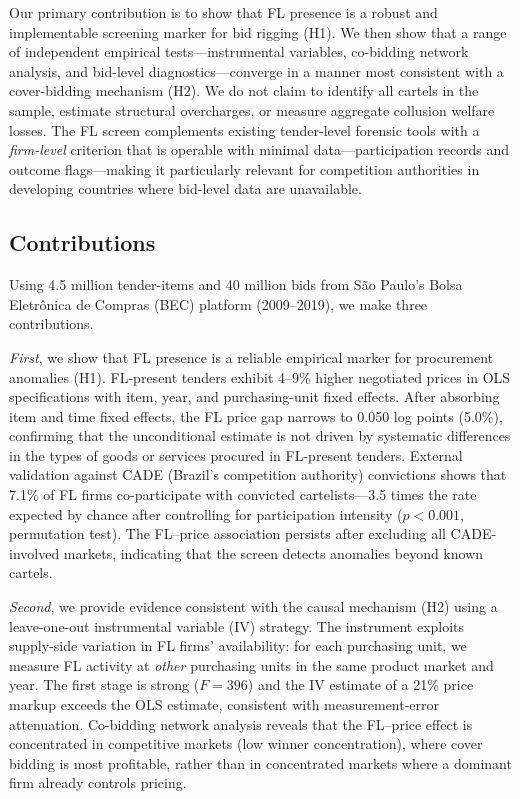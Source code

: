 \noindent Our primary contribution is to show that FL presence is a
robust and implementable screening marker for bid rigging (H1). We then
show that a range of independent empirical tests---instrumental
variables, co-bidding network analysis, and bid-level
diagnostics---converge in a manner most consistent with a cover-bidding
mechanism (H2). We do not claim to identify all cartels in the sample,
estimate structural overcharges, or measure aggregate collusion welfare
losses. The FL screen complements existing tender-level forensic tools
\citep{imhof2019detecting} with a \emph{firm-level} criterion that is
operable with minimal data---participation records and outcome
flags---making it particularly relevant for competition authorities in
developing countries where bid-level data are unavailable.

\subsection{Contributions}

Using 4.5 million tender-items and 40 million bids from S\~ao Paulo's
Bolsa Eletr\^onica de Compras (BEC) platform (2009--2019), we make three
contributions.

\emph{First}, we show that FL presence is a reliable empirical marker
for procurement anomalies (H1). FL-present tenders exhibit 4--9\%
higher negotiated prices in OLS specifications with item, year, and
purchasing-unit fixed effects. After absorbing item and time fixed %
effects, the FL price gap narrows to 0.050 log points (5.0\%),
confirming that the unconditional estimate is not driven by systematic
differences in the types of goods or services procured in FL-present
tenders. External validation against CADE
(Brazil's competition authority) convictions shows that 7.1\% of FL
firms co-participate with convicted cartelists---3.5 times the rate
expected by chance after controlling for participation intensity
($p < 0.001$, permutation test). The FL--price association persists
after excluding all CADE-involved markets, indicating that the screen
detects anomalies beyond known cartels.

\emph{Second}, we provide evidence consistent with the causal mechanism
(H2) using a leave-one-out instrumental variable (IV) strategy. The
instrument exploits supply-side variation in FL firms' availability: for
each purchasing unit, we measure FL activity at \emph{other} purchasing
units in the same product market and year. The first stage is strong
($F = 396$) and the IV estimate of a 21\% price markup exceeds the OLS
estimate, consistent with measurement-error attenuation. Co-bidding
network analysis reveals that the FL--price effect is concentrated in
competitive markets (low winner concentration), where cover bidding is
most profitable, rather than in concentrated markets where a dominant
firm already controls pricing.

